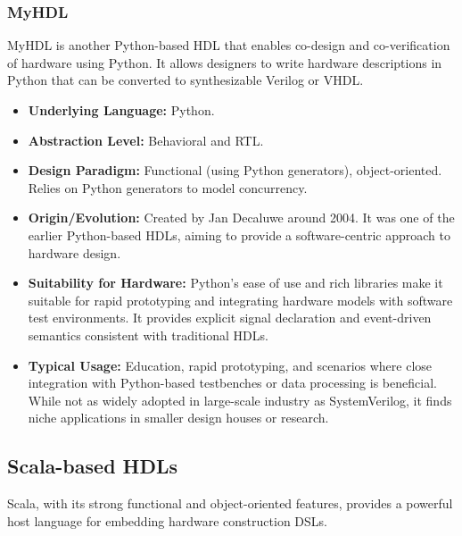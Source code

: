 \documentclass[sigconf, anonymous=false]{acmart} %
\begin{document}
\subsubsection{MyHDL}
MyHDL\cite{myHDL} is another Python-based HDL that enables co-design and co-verification of hardware using Python. It allows designers to write hardware descriptions in Python that can be converted to synthesizable Verilog or VHDL.
\begin{itemize}
    \item \textbf{Underlying Language:} Python.
    \item \textbf{Abstraction Level:} Behavioral and RTL.
    \item \textbf{Design Paradigm:} Functional (using Python generators), object-oriented. Relies on Python generators to model concurrency.
    \item \textbf{Origin/Evolution:} Created by Jan Decaluwe around 2004. It was one of the earlier Python-based HDLs, aiming to provide a software-centric approach to hardware design.
    \item \textbf{Suitability for Hardware:} Python's ease of use and rich libraries make it suitable for rapid prototyping and integrating hardware models with software test environments. It provides explicit signal declaration and event-driven semantics consistent with traditional HDLs.
    \item \textbf{Typical Usage:} Education, rapid prototyping, and scenarios where close integration with Python-based testbenches or data processing is beneficial. While not as widely adopted in large-scale industry as SystemVerilog, it finds niche applications in smaller design houses or research.
\end{itemize}

\subsection{Scala-based HDLs}
Scala, with its strong functional and object-oriented features, provides a powerful host language for embedding hardware construction DSLs.
\end{document}
